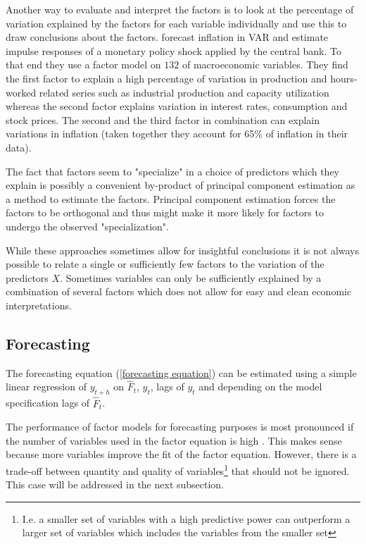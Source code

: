 \documentclass[12pt]{article}
\begin{document}
Another way to evaluate and interpret the factors is to look at the percentage of variation explained by the factors for each variable individually and use this to draw conclusions about the factors. \citet{stock2005implications} forecast inflation in VAR and estimate impulse responses of a monetary policy shock applied by the central bank. To that end they use a factor model on $132$ of macroeconomic variables. They find the first factor to explain a high percentage of variation in production and hours-worked related series such as industrial production and capacity utilization whereas the second factor explains variation in interest rates, consumption and stock prices. The second and the third factor in combination can explain variations in inflation (taken together they account for 65\% of inflation in their data).

The fact that factors seem to "specialize" in a choice of predictors which they explain is possibly a convenient by-product of principal component estimation as a method to estimate the factors. Principal component estimation forces the factors to be orthogonal and thus might make it more likely for factors to undergo the observed "specialization".

While these approaches sometimes allow for insightful conclusions it is not always possible to relate a single or sufficiently few factors to the variation of the predictors $X$. Sometimes variables can only be sufficiently explained by a combination of several factors which does not allow for easy and clean economic interpretations. 


\subsection{Forecasting}
The forecasting equation (\ref{forecasting equation}) can be estimated using a simple linear regression of $y_{t+h}$ on $\hat F_t$, $y_t$, lags of $y_t$ and depending on the model specification lags of $\hat F_t$.

The performance of factor models for forecasting purposes is most pronounced if the number of variables used in the factor equation is high \citep{stock2011dynamic}. This makes sense because more variables improve the fit of the factor equation. However, there is a trade-off between quantity and quality of variables\footnote{I.e. a smaller set of variables with a high predictive power can outperform a larger set of variables which includes the variables from the smaller set} that should not be ignored. This case will be addressed in the next subsection.
\end{document}
